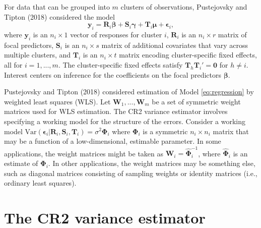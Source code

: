 \documentclass[12pt]{article}
\begin{document}
For data that can be grouped into \(m\) clusters of observations,
Pustejovsky and Tipton (2018) considered the model \begin{equation}
\label{eq:regression}
\mathbf{y}_i = \mathbf{R}_i \boldsymbol\beta + \mathbf{S}_i \boldsymbol\gamma + \mathbf{T}_i \boldsymbol\mu + \boldsymbol\epsilon_i,
\end{equation} where \(\mathbf{y}_i\) is an \(n_i \times 1\) vector of
responses for cluster \(i\), \(\mathbf{R}_i\) is an \(n_i \times r\)
matrix of focal predictors, \(\mathbf{S}_i\) is an \(n_i \times s\)
matrix of additional covariates that vary across multiple clusters, and
\(\mathbf{T}_i\) is an \(n_i \times t\) matrix encoding cluster-specific
fixed effects, all for \(i = 1,...,m\). The cluster-specific fixed
effects satisfy \(\mathbf{T}_h \mathbf{T}_i' = \mathbf{0}\) for
\(h \neq i\). Interest centers on inference for the coefficients on the
focal predictors \(\boldsymbol\beta\).

Pustejovsky and Tipton (2018) considered estimation of Model
\ref{eq:regression} by weighted least squares (WLS). Let
\(\mathbf{W}_1,...,\mathbf{W}_m\) be a set of symmetric weight matrices
used for WLS estimation. The CR2 variance estimator involves specifying
a working model for the structure of the errors. Consider a working
model
\(\text{Var}\left(\boldsymbol\epsilon_i | \mathbf{R}_i, \mathbf{S}_i, \mathbf{T}_i\right) = \sigma^2 \boldsymbol\Phi_i\)
where \(\boldsymbol\Phi_i\) is a symmetric \(n_i \times n_i\) matrix
that may be a function of a low-dimensional, estimable parameter. In
some applications, the weight matrices might be taken as
\(\mathbf{W}_i = \boldsymbol{\hat\Phi}_i^{-1}\), where
\(\boldsymbol{\hat\Phi}_i\) is an estimate of \(\boldsymbol\Phi_i\). In
other applications, the weight matrices may be something else, such as
diagonal matrices consisting of sampling weights or identity matrices
(i.e., ordinary least squares).

\hypertarget{the-cr2-variance-estimator}{%
\section{The CR2 variance estimator}\label{the-cr2-variance-estimator}}
\end{document}

